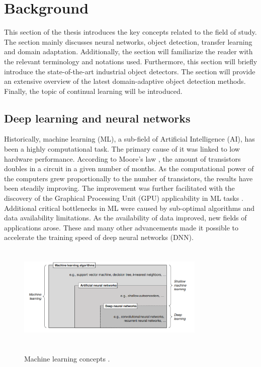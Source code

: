 \section{Background}
This section of the thesis introduces the key concepts related to the field of study. The section mainly discusses neural networks, object detection, transfer learning and domain adaptation. Additionally, the section will familiarize the reader with the relevant terminology and notations used. Furthermore, this section will briefly introduce the state-of-the-art industrial object detectors. The section will provide an extensive overview of the latest domain-adaptive object detection methods. Finally, the topic of  continual learning will be introduced. 
\subsection{Deep learning and neural networks}
Historically, machine learning (ML), a sub-field of Artificial Intelligence (AI), has been a highly computational task. The primary cause of it was linked to low hardware performance. According to Moore's law \cite{Etiemble2022}, the amount of transistors doubles in a circuit in a given number of months.  As the computational power of the computers grew proportionally to the number of transistors, the results have been steadily improving. The improvement was further facilitated with the discovery of the Graphical Processing Unit (GPU) applicability in ML tasks \cite{Hwang2018}. Additional critical bottlenecks in ML were caused by sub-optimal algorithms and data availability limitations. As the availability of data improved, new fields of applications arose. These and many other advancements made it possible to accelerate the training speed of deep neural networks (DNN).  

\begin{figure}[htb]
	\begin{center}
		\includegraphics[width=0.8\textwidth,height=50mm]{./ml1.png}
	\end{center}
	\caption{Machine learning concepts \cite{Janiesch2021}.}
	\begin{center}
		\label{MLConcepts}
	\end{center}
\end{figure}


